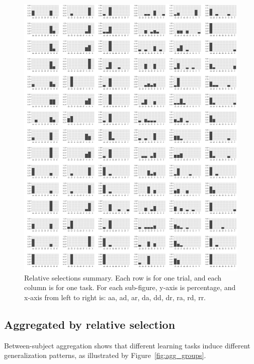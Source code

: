 \documentclass{article}
\begin{document}
\begin{figure}[h!]
  \centering
  \includegraphics[width=.8\linewidth]{trials_relative}
  \caption{Relative selections summary. Each row is for one trial, and each column is for one task. For each sub-figure, y-axis is percentage, and x-axis from left to right is: aa, ad, ar, da, dd, dr, ra, rd, rr.}
  \label{fig:sum_rel}
\end{figure}

\newpage
\subsection{Aggregated by relative selection}

Between-subject aggregation shows that different learning tasks induce different generalization patterns, as illustrated by Figure~\ref{fig:agg_groups}.
\end{document}
